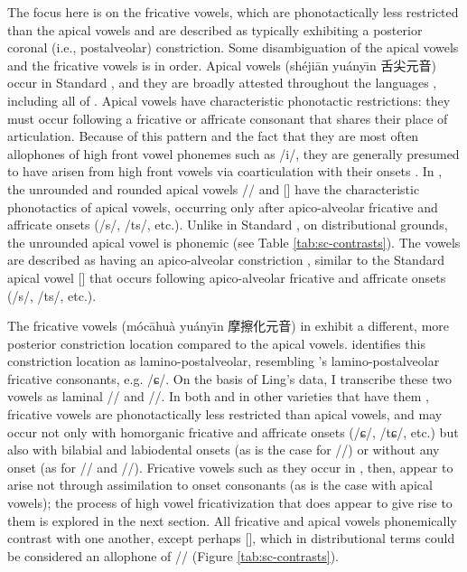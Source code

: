 \documentclass[output=paper,hidelinks]{langscibook}
\begin{document}
The focus here is on the fricative vowels, which are phonotactically less restricted than the apical vowels and are described as typically exhibiting a posterior coronal (i.e., postalveolar) constriction. Some disambiguation of the apical vowels and the fricative vowels is in order.
%
Apical vowels (sh\'eji\={a}n yu\'any\={\i}n {\cjkfont 舌尖元音}) occur in Standard  \citep{leekim-s, faytak-icphs}, and they are broadly attested throughout the  languages \citep{zee-icphs, lee-encyclopedia}, including all of  \citep{qian}. Apical vowels have characteristic phonotactic restrictions: they must occur following a fricative or affricate consonant that shares their place of articulation. Because of this pattern and the fact that they are most often allophones of high front vowel phonemes such as /i/, they are generally presumed to have arisen from high front vowels via coarticulation with their onsets \citep{chen-middle, yu-aero}. In \SC{}, the unrounded and rounded apical vowels /\zz{}/ and [\zw{}] have the characteristic phonotactics of apical vowels,  occurring only after apico-alveolar fricative and affricate onsets (/s/, /ts/, etc.). Unlike in Standard , on distributional grounds, the \SC{} unrounded apical vowel is phonemic (see Table \ref{tab:sc-contrasts}). The \SC{} vowels are described as having an apico-alveolar constriction \citep{ling-phd, wang-suzhou}, similar to the Standard  apical vowel [\zz{}] that occurs following apico-alveolar fricative and affricate onsets (/s/, /ts/, etc.).

The fricative vowels (m\'{o}c\={a}hu\`{a} yu\'{a}ny\={\i}n {\cjkfont 摩擦化元音}) in \SC{} exhibit a different, more posterior constriction location compared to the apical vowels. \citep[43--50]{ling, ling-phd} identifies this constriction location as lamino-postalveolar, resembling \SC{}'s lamino-postalveolar fricative consonants, e.g. /ɕ/. On the basis of Ling's data, I transcribe these two vowels as laminal /\iz{}/ and /\yz{}/. In both \SC{} and in other  varieties that have them \citep{zhu-high}, fricative vowels are phonotactically less restricted than apical vowels, and may occur not only with homorganic fricative and affricate onsets (/ɕ/, /tɕ/, etc.) but also with bilabial and labiodental onsets (as is the case for /\iz{}/) or without any onset (as for /\iz{}/ and /\yz{}/). Fricative vowels such as they occur in \SC{}, then, appear to arise not through assimilation to onset consonants (as is the case with apical vowels); the process of high vowel fricativization that does appear to give rise to them is explored in the next section. All \SC{} fricative and apical vowels phonemically contrast with one another, except perhaps [\zw{}], which in distributional terms could be considered an allophone of /\yz{}/ (Figure \ref{tab:sc-contrasts}).
\end{document}
